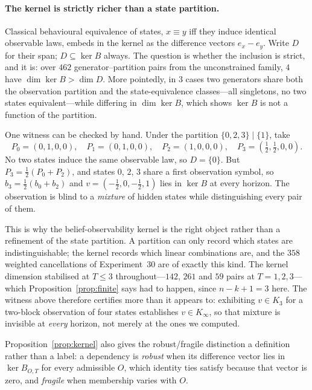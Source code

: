 \documentclass[11pt]{article}
\begin{document}
\paragraph{The kernel is strictly richer than a state partition.}
Classical behavioural equivalence of states, $x \equiv y$ iff they induce identical
observable laws, embeds in the kernel as the difference vectors $e_x - e_y$. Write $D$ for
their span; $D \subseteq \ker B$ always. The question is whether the inclusion is strict,
and it is: over $462$ generator--partition pairs from the unconstrained family, $4$ have
$\dim \ker B > \dim D$. More pointedly, in $3$ cases two generators share both the
observation partition and the state-equivalence classes---all singletons, no two states
equivalent---while differing in $\dim \ker B$, which shows $\ker B$ is not a function of
the partition.

One witness can be checked by hand. Under the partition $\{0,2,3\} \mid \{1\}$, take
\[
  P_0 = (0,1,0,0), \quad P_1 = (0,1,0,0), \quad P_2 = (1,0,0,0), \quad
  P_3 = (\tfrac12, \tfrac12, 0, 0).
\]
No two states induce the same observable law, so $D = \{0\}$. But
$P_3 = \tfrac12(P_0 + P_2)$, and states $0$, $2$, $3$ share a first observation symbol, so
$b_3 = \tfrac12(b_0 + b_2)$ and $v = (-\tfrac12, 0, -\tfrac12, 1)$ lies in $\ker B$ at
every horizon. The observation is blind to a \emph{mixture} of hidden states while
distinguishing every pair of them.

This is why the belief-observability kernel is the right object rather than a refinement of the state
partition. A partition can only record which states are indistinguishable; the kernel
records which linear combinations are, and the $358$ weighted cancellations of
Experiment~30 are of exactly this kind. The kernel dimension stabilised at $T \le 3$ throughout---$142$, $261$ and $59$ pairs at
$T = 1, 2, 3$---which Proposition~\ref{prop:finite} says had to happen, since $n - k + 1 = 3$
here. The witness above therefore certifies more than it appears to: exhibiting
$v \in K_3$ for a two-block observation of four states establishes $v \in K_\infty$, so
that mixture is invisible at \emph{every} horizon, not merely at the ones we computed.

Proposition~\ref{prop:kernel} also gives the robust/fragile distinction a definition rather
than a label: a dependency is \emph{robust} when its difference vector lies in
$\ker B_{O,T}$ for every admissible $O$, which identity ties satisfy because that vector is
zero, and \emph{fragile} when membership varies with $O$.
\end{document}
